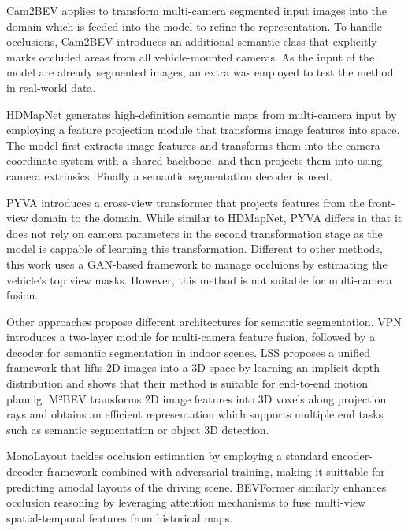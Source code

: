 Cam2BEV \cite{Cam2BEV} applies  to transform multi-camera segmented input images into the  domain which is feeded into the model to refine the  representation. To handle occlusions, Cam2BEV introduces an additional semantic class that explicitly marks occluded areas from all vehicle-mounted cameras. As the input of the model are already segmented images, an extra  was employed to test the method in real-world data.  

HDMapNet \cite{HDMapNet} generates high-definition semantic maps from multi-camera input by employing a feature projection module that transforms image features into  space. The model first extracts image features and transforms them into the camera coordinate system with a shared  backbone, and then projects them into  using camera extrinsics. Finally a semantic segmentation decoder is used.

PYVA \cite{PYVA} introduces a cross-view transformer that projects features from the front-view domain to the  domain. While similar to HDMapNet, PYVA differs in that it does not rely on camera parameters in the second transformation stage as the model is cappable of learning this transformation. Different to other methods, this work uses a GAN-based framework to manage occluions by estimating the vehicle's top view masks. However, this method is not suitable for multi-camera fusion.

Other approaches propose different architectures for  semantic segmentation. VPN \cite{view_parsing_network} introduces a two-layer  module for multi-camera feature fusion, followed by a decoder for semantic segmentation in indoor scenes. LSS \cite{lift_splat_shoot} proposes a unified framework that lifts 2D images into a 3D space by learning an implicit depth distribution and shows that their method is suitable for end-to-end motion plannig. M²BEV \cite{m2bev} transforms 2D image features into 3D voxels along projection rays and obtains an efficient  representation which supports multiple end tasks such as semantic segmentation or object 3D detection.

MonoLayout \cite{mono_layout} tackles occlusion estimation by employing a standard encoder-decoder framework combined with adversarial training, making it suittable for predicting amodal layouts of the driving scene. BEVFormer \cite{BEVFormer} similarly enhances occlusion reasoning by leveraging attention mechanisms to fuse multi-view spatial-temporal features from historical  maps.

